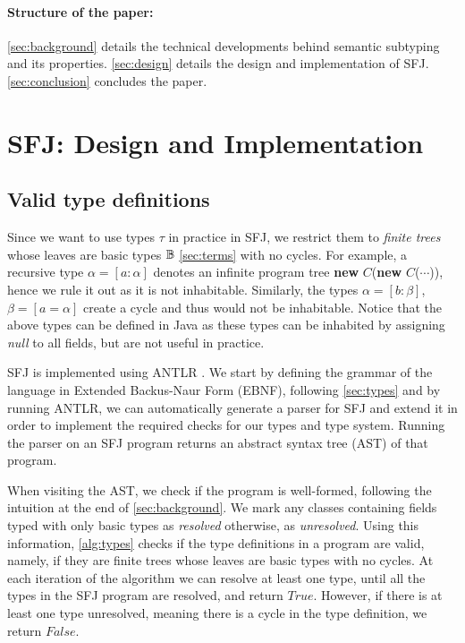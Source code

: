 \documentclass[runningheads]{llncs}
\begin{document}

\paragraph{Structure of the paper:}
\autoref{sec:background} details the technical developments behind semantic subtyping and its properties.
\autoref{sec:design} details the design and implementation of SFJ.
\autoref{sec:conclusion} concludes the paper.



\section{SFJ: Design and Implementation}
\label{sec:design}
\subsection{Valid type definitions}
Since we want to use types $\tau$ in practice in SFJ, we restrict them to \emph{finite trees} whose leaves are basic types ${\mathbb B}$ \autoref{sec:terms} with no cycles.
For example, a recursive type $\alpha = [a : \alpha]$ denotes an infinite program tree \textbf{new} $C$(\textbf{new} $C$($\cdots{}$)), hence we rule it out as it is not inhabitable.
Similarly, the types $\alpha = [b: \beta]$, $\beta = [a = \alpha]$ create a cycle and thus would not be inhabitable.
Notice that the above types can be defined in Java as these types can be inhabited by assigning \emph{null} to all fields, but are not useful in practice.

SFJ is implemented using ANTLR \cite{parr2013}.
We start by defining the grammar of the language in Extended Backus-Naur Form (EBNF), following \autoref{sec:types} and by running ANTLR, we can automatically generate a parser for SFJ and extend it in order to implement the required checks for our types and type system.
Running the parser on an SFJ program returns an abstract syntax tree (AST) of that program.

When visiting the AST, we check if the program is well-formed, following the intuition at the end of \autoref{sec:background}.
We mark any classes containing fields typed with only basic types as \emph{resolved} otherwise, as \emph{unresolved}.
Using this information, \autoref{alg:types} checks if the type definitions in a program are valid, namely, if they are finite trees whose leaves are basic types with no cycles.
%
At each iteration of the algorithm we can resolve at least one type, until all the types in the SFJ program are resolved, and return $True$.
However, if there is at least one type unresolved, meaning there is a cycle in the type definition, we return $False$.
\end{document}

